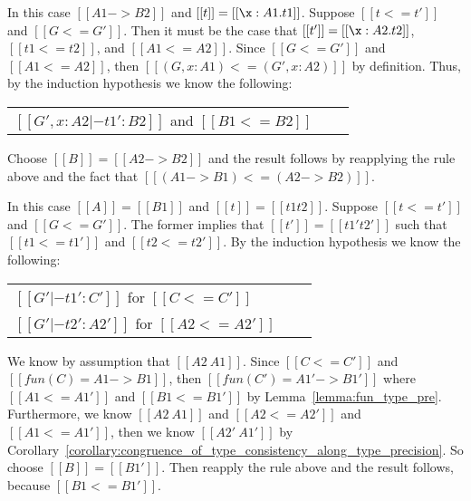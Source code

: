 \begin{description}
\item[]
\item 
  \noindent
  In this case $[[A1 -> B2]]$ and $[[t]] = [[\x:A1.t1]]$.  Suppose $[[t <= t']]$ and $[[G <= G']]$.
  Then it must be the case that $[[t']] = [[\x:A2.t2]]$, $[[t1 <= t2]]$, and $[[A1 <= A2]]$.
  Since $[[G <= G']]$ and $[[A1 <= A2]]$, then $[[(G, x : A1) <= (G', x : A2)]]$ by definition.
  Thus, by the induction hypothesis we know the following:
  \begin{center}
    \begin{tabular}{lll}
      $[[G', x : A2 |- t1' : B2]]$ and $[[B1 <= B2]]$
    \end{tabular}
  \end{center} 
  Choose $[[B]] = [[A2 -> B2]]$ and the result follows by reapplying the rule above
  and the fact that $[[(A1 -> B1) <= (A2 -> B2)]]$.

\item[]
\item 
  
  \noindent
  In this case $[[A]] = [[B1]]$ and $[[t]] = [[t1 t2]]$.  Suppose $[[t <= t']]$
  and $[[G <= G']]$.  The former implies that $[[t']] = [[t1' t2']]$ such that
  $[[t1 <= t1']]$ and $[[t2 <= t2']]$.  By the induction hypothesis we know the
  following:
  \begin{center}
    \begin{tabular}{lll}
      $[[G' |- t1' : C']]$ for $[[C <= C']]$\\
      $[[G' |- t2' : A2']]$ for $[[A2 <= A2']]$\\
    \end{tabular}
  \end{center}
  We know by assumption that $[[A2 ~ A1]]$.  
  Since $[[C <= C']]$ and $[[fun(C) = A1 -> B1]]$, then $[[fun(C') = A1' -> B1']]$
  where $[[A1 <= A1']]$ and $[[B1 <= B1']]$ by Lemma~\ref{lemma:fun_type_pre}.
  Furthermore, we know $[[A2 ~ A1]]$ and $[[A2 <= A2']]$ and $[[A1 <= A1']]$, then
  we know $[[A2' ~ A1']]$ by Corollary~\ref{corollary:congruence_of_type_consistency_along_type_precision}.
  So choose $[[B]] = [[B1']]$. Then reapply the rule above and the result follows, because
  $[[B1 <= B1']]$.
\end{description}

